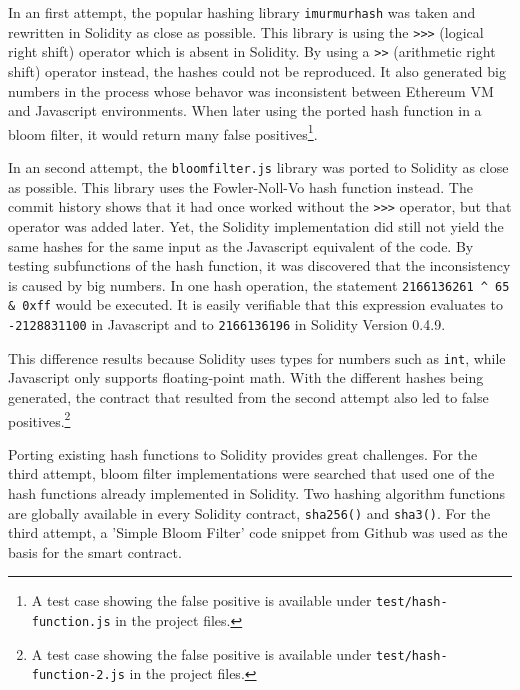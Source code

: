 In an first attempt, the popular hashing library \texttt{imurmurhash} \cite{imurmur} was taken and rewritten in Solidity as close as possible. This library is using the \texttt{\textgreater{}\textgreater{}\textgreater} (logical right shift) operator which is absent in Solidity. By using a \texttt{\textgreater{}\textgreater} (arithmetic right shift) operator instead, the hashes could not be reproduced. It also generated big numbers in the process whose behavor was inconsistent between Ethereum VM and Javascript environments.
When later using the ported hash function in a bloom filter, it would return many false positives\footnote{A test case showing the false positive is available under \texttt{test/hash-function.js} in the project files.}.

In an second attempt, the \texttt{bloomfilter.js} \cite{bloomfilterjs} library was ported to Solidity as close as possible. This library uses the Fowler-Noll-Vo hash function instead. The commit history shows that it had once worked without the \texttt{\textgreater{}\textgreater{}\textgreater} operator, but that operator was added later. Yet, the Solidity implementation did still not yield the same hashes for the same input as the Javascript equivalent of the code. By testing subfunctions of the hash function, it was discovered that the inconsistency is caused by big numbers. In one hash operation, the statement \texttt{2166136261 \textasciicircum{} 65 \& 0xff} would be executed. It is easily verifiable that this expression evaluates to \texttt{-2128831100} in Javascript and to \texttt{2166136196} in Solidity Version 0.4.9.

This difference results because Solidity uses types for numbers such as \texttt{int}, while Javascript only supports floating-point math. With the different hashes being generated, the contract that resulted from the second attempt also led to false positives.\footnote{A test case showing the false positive is available under \texttt{test/hash-function-2.js} in the project files.}

Porting existing hash functions to Solidity provides great challenges. For the third attempt, bloom filter implementations were searched that used one of the hash functions already implemented in Solidity. Two hashing algorithm functions are globally available in every Solidity contract, \texttt{sha256()} and \texttt{sha3()}. For the third attempt, a 'Simple Bloom Filter' \cite{SimpleBloomFilter} code snippet from Github was used as the basis for the smart contract.

